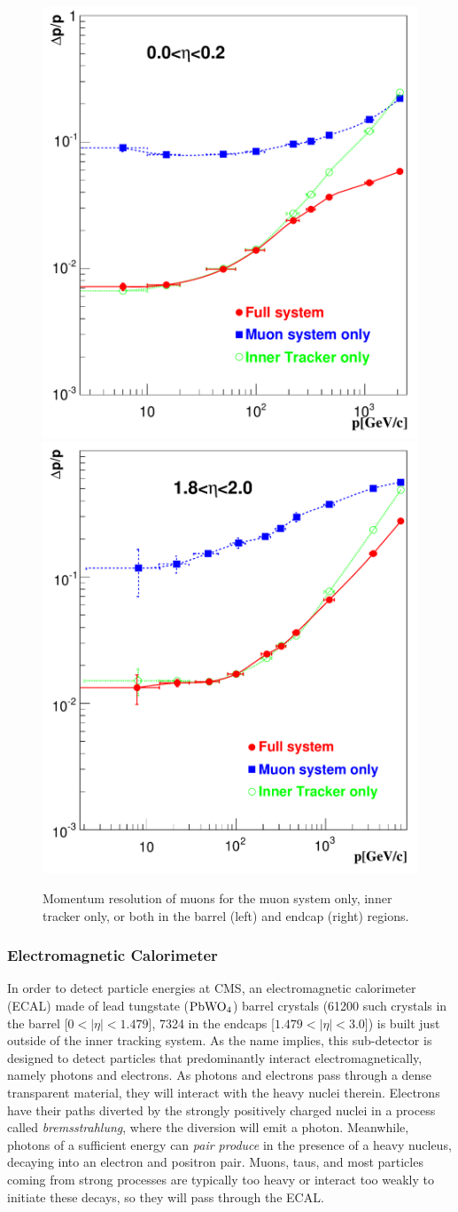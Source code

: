 \begin{figure}[htbp]
\begin{center}
\includegraphics[width=.45\linewidth]{Experiment/figures/MuonMomentumResolution_smalleta.pdf}
\includegraphics[width=.45\linewidth]{Experiment/figures/MuonMomentumResolution_higheta.pdf}
\caption[Muon Momentum Resolution at CMS]{Momentum resolution of muons for the muon system only, inner tracker only, or both in the barrel (left) and endcap (right) regions.}
\label{fig:MuonMomentumResolution}
\end{center}
\end{figure}


\subsubsection{Electromagnetic Calorimeter}
\label{sec:ElecCalo}

In order to detect particle energies at CMS, an electromagnetic calorimeter (ECAL) made of lead tungstate ($\rm{PbWO}_4$) barrel crystals (61200 such crystals in the barrel [$0<|\eta|<1.479$], 7324 in the endcaps [$1.479<|\eta|<3.0$]) is built just outside of the inner tracking system. As the name implies, this sub-detector is designed to detect particles that predominantly interact electromagnetically, namely photons and electrons. As photons and electrons pass through a dense transparent material, they will interact with the heavy nuclei therein. Electrons have their paths diverted by the strongly positively charged nuclei in a process called \textit{bremsstrahlung}, where the diversion will emit a photon. Meanwhile, photons of a sufficient energy can \textit{pair produce} in the presence of a heavy nucleus, decaying into an electron and positron pair. Muons, taus, and most particles coming from strong processes are typically too heavy or interact too weakly to initiate these decays, so they will pass through the ECAL.

